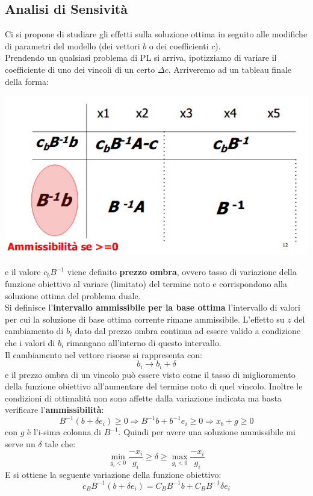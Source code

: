 \message{ !name(ro.tex)}\documentclass[a4paper,12pt, oneside]{book}
\begin{document}
\subsection{Analisi di Sensività}
Ci si propone di studiare gli effetti sulla soluzione ottima in
seguito alle modifiche di parametri del modello (dei vettori $b$ o dei
coefficienti $c$).\\
Prendendo un qualsiasi problema di PL si arriva, ipotizziamo di
variare il coefficiente di uno dei vincoli di un certo $\Delta
c$. Arriveremo ad un tableau finale della forma:
\begin{center}
  \includegraphics[scale = 0.7]{img/add.png}
\end{center}
e il valore $c_bB^{-1}$ viene definito \textbf{prezzo ombra}, ovvero
tasso di variazione della funzione obiettivo al variare (limitato)
del termine noto e corrispondono alla soluzione ottima del problema
duale.\\
Si definisce l'\textbf{intervallo ammissibile per la base ottima}
l'intervallo di valori per cui la soluzione di base ottima corrente
rimane ammissibile. L'effetto su $z$ del cambiamento di $b_i$ dato dal
prezzo ombra continua ad essere valido a condizione che i valori di
$b_i$ rimangano all'interno di questo intervallo.\\
Il cambiamento nel vettore risorse si rappresenta con:
\[b_i\to b_i+\delta\]
e il prezzo ombra di un vincolo può essere visto come il tasso di
miglioramento della funzione obiettivo all'aumentare del termine noto
di quel vincolo. Inoltre le condizioni di ottimalità non sono affette
dalla variazione indicata ma basta verificare
l'\textbf{ammissibilità}:
\[B^{-1}(b+\delta e_i)\geq 0\Longrightarrow B^{-1}b+b^{-1}e_i\geq
  0\Longrightarrow x_b+g\geq 0\]
con $g$ è l'i-sima colonna di $B^{-1}$. Quindi per avere una soluzione
ammissibile mi serve un $\delta$ tale che:
\[\min_{g_i<0}\frac{-x_i}{g_i}\geq \delta \geq \max_{g_i<0}\frac{-x_i}{g_i}\]
E si ottiene la seguente variazione della funzione obiettivo:
\[c_BB^{-1}(b+\delta e_i)=C_BB^{-1}b+C_BB^{-1}\delta e_i\]
\end{document}
